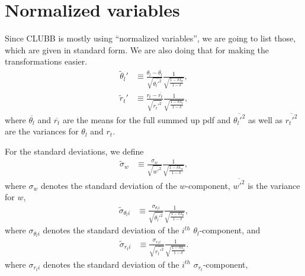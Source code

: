 \section{Normalized variables}\label{sec:normalized-variables}

Since \gls{CLUBB} is mostly using \enquote{normalized variables},
we are going to list those, which are given in standard form.
We are also doing that for making the transformations easier.
\begin{align}
    \label{eq:theta_l_prime_tilde}
    \tilde{\theta}_l'
    &\equiv \frac{\theta_l - \overline{\theta_l}}{\sqrt{\overline{\theta_l'^2}}}
    \frac{1}{\sqrt{\frac{1 - \delta \lambda_\theta}{1 - \delta}}},
\end{align}
\begin{align}
    \label{eq:r_t_prime_tilde}
    \tilde{r}_t'
    &\equiv \frac{r_t - \overline{r_t}}{\sqrt{\overline{r_t'^2}}}
    \frac{1}{\sqrt{\frac{1 - \delta \lambda_r}{1 - \delta}}},
\end{align}
where $\overline{\theta_l}$ and $\overline{r_t}$ are the means for the full summed up \gls{pdf}
and $\overline{\theta_l'^2}$ as well as $\overline{r_t'^2}$ are the variances for $\theta_l$ and $r_t$.

For the standard deviations, we define
\begin{align}
    \label{eq:sigma_w_tilde}
    \tilde{\sigma}_w
    &\equiv \frac{\sigma_w}{\sqrt{\overline{w'^2}}}
    \frac{1}{\sqrt{\frac{1-\delta\lambda_w}{1-\delta}}},
\end{align}
where $\sigma_w$ denotes the standard deviation of the $w$-component,
$\overline{w'^2}$ is the variance for $w$,
\begin{align}
    \label{eq:sigma_theta_l_i_tilde}
    \tilde{\sigma}_{\theta_l i}
    &\equiv \frac{\sigma_{\theta_l i}}{\sqrt{\overline{\theta_l'^2}}}
    \frac{1}{\sqrt{\frac{1-\delta\lambda_\theta}{1-\delta}}},
\end{align}
where $\sigma_{\theta_l i}$ denotes the standard deviation of the $i^{th}$ $\theta_l$-component,
and
\begin{align}
    \label{eq:sigma_r_t_i_tilde}
    \tilde{\sigma}_{r_t i}
    &\equiv \frac{\sigma_{r_t i}}{\sqrt{\overline{r_t'^2}}}
    \frac{1}{\sqrt{\frac{1-\delta\lambda_r}{1-\delta}}}.
\end{align}
where $\sigma_{r_t i}$ denotes the standard deviation of the $i^{th}$ $\sigma_{r_t}$-component,